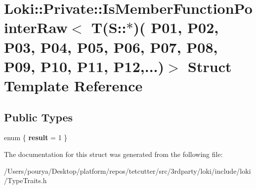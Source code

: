 \hypertarget{structLoki_1_1Private_1_1IsMemberFunctionPointerRaw_3_01T_07S_1_1_5_08_07_01_01_01_01_01_01_01_0c4177e1eec6f278b33fea2b0fafbf57d}{}\section{Loki\+:\+:Private\+:\+:Is\+Member\+Function\+Pointer\+Raw$<$ T(S\+:\+:$\ast$)( P01, P02, P03, P04, P05, P06, P07, P08, P09, P10, P11, P12,...)$>$ Struct Template Reference}
\label{structLoki_1_1Private_1_1IsMemberFunctionPointerRaw_3_01T_07S_1_1_5_08_07_01_01_01_01_01_01_01_0c4177e1eec6f278b33fea2b0fafbf57d}
\subsection*{Public Types}
\begin{DoxyCompactItemize}
\item 
\hypertarget{structLoki_1_1Private_1_1IsMemberFunctionPointerRaw_3_01T_07S_1_1_5_08_07_01_01_01_01_01_01_01_0c4177e1eec6f278b33fea2b0fafbf57d_a3b6d5718b23113f7b511a059f5dcf9e2}{}enum \{ {\bfseries result} = 1
 \}\label{structLoki_1_1Private_1_1IsMemberFunctionPointerRaw_3_01T_07S_1_1_5_08_07_01_01_01_01_01_01_01_0c4177e1eec6f278b33fea2b0fafbf57d_a3b6d5718b23113f7b511a059f5dcf9e2}

\end{DoxyCompactItemize}


The documentation for this struct was generated from the following file\+:\begin{DoxyCompactItemize}
\item 
/\+Users/pourya/\+Desktop/platform/repos/tetcutter/src/3rdparty/loki/include/loki/Type\+Traits.\+h\end{DoxyCompactItemize}
